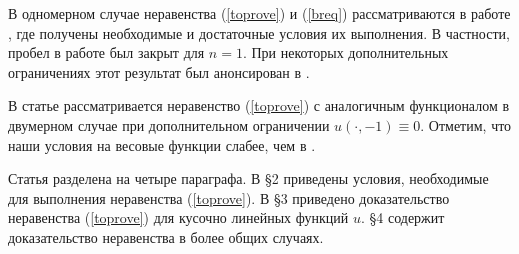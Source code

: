 В одномерном случае неравенства (\ref{toprove}) и (\ref{breq}) рассматриваются в работе \cite{1dim},
где получены необходимые и достаточные условия их выполнения.
В частности, пробел в работе \cite{Brock} был закрыт для $n = 1$.
При некоторых дополнительных ограничениях этот результат был анонсирован в \cite{DAN}.

В статье \cite{Landes} рассматривается неравенство (\ref{toprove}) с аналогичным функционалом в двумерном случае
при дополнительном ограничении $u(\cdot, -1) \equiv 0$.
Отметим, что наши условия на весовые функции слабее, чем в \cite{Landes}.

Статья разделена на четыре параграфа.
В \S2 приведены условия, необходимые для выполнения неравенства (\ref{toprove}).
В \S3 приведено доказательство неравенства (\ref{toprove}) для кусочно линейных функций $u$.
\S4 содержит доказательство неравенства в более общих случаях.
